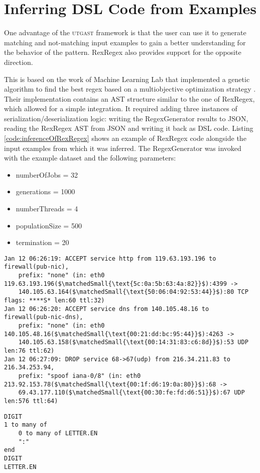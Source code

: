 \section{Inferring DSL Code from Examples} \label{sec:inferenceOfRexRegex}

One advantage of the \textsc{utgast} framework is that the user can use it to generate matching and not-matching input examples to gain a better understanding for the behavior of the pattern. RexRegex also provides support for the opposite direction.

This is based on the work of Machine Learning Lab that implemented a genetic algorithm to find the best regex based on a multiobjective optimization strategy \cite{bartoli2016inference}\cite{bartoli2016can}\cite{bartoli2015evolutionary}. Their implementation contains an AST structure similar to the one of RexRegex, which allowed for a simple integration. It required adding three instances of serialization/deserialization logic: writing the RegexGenerator results to JSON, reading the RexRegex AST from JSON and writing it back as DSL code.
Listing \ref{code:inferenceOfRexRegex} shows an example of RexRegex code alongside the input examples from which it was inferred. The RegexGenerator was invoked with the example dataset and the following parameters:

\begin{itemize}
    \item numberOfJobs = 32
    \item generations = 1000
    \item numberThreads = 4
    \item populationSize = 500
    \item termination = 20
\end{itemize}

\FloatBarrier

\begin{listingBox}[float=htb,title={Infered RexRegex Code from Examples},label=code:inferenceOfRexRegex]
    \begin{lstlisting}[basicstyle=\scriptsize,mathescape=true]
Jan 12 06:26:19: ACCEPT service http from 119.63.193.196 to firewall(pub-nic), 
    prefix: "none" (in: eth0 119.63.193.196($\matchedSmall{\text{5c:0a:5b:63:4a:82}}$):4399 -> 
    140.105.63.164($\matchedSmall{\text{50:06:04:92:53:44}}$):80 TCP flags: ****S* len:60 ttl:32)
Jan 12 06:26:20: ACCEPT service dns from 140.105.48.16 to firewall(pub-nic-dns), 
    prefix: "none" (in: eth0 140.105.48.16($\matchedSmall{\text{00:21:dd:bc:95:44}}$):4263 -> 
    140.105.63.158($\matchedSmall{\text{00:14:31:83:c6:8d}}$):53 UDP len:76 ttl:62)
Jan 12 06:27:09: DROP service 68->67(udp) from 216.34.211.83 to 216.34.253.94, 
    prefix: "spoof iana-0/8" (in: eth0 213.92.153.78($\matchedSmall{\text{00:1f:d6:19:0a:80}}$):68 -> 
    69.43.177.110($\matchedSmall{\text{00:30:fe:fd:d6:51}}$):67 UDP len:576 ttl:64)
    \end{lstlisting}
    \tcblower
    \begin{lstlisting}[style=rexregex]
DIGIT
1 to many of
    0 to many of LETTER.EN
    ":"
end
DIGIT
LETTER.EN
    \end{lstlisting}
\end{listingBox}

